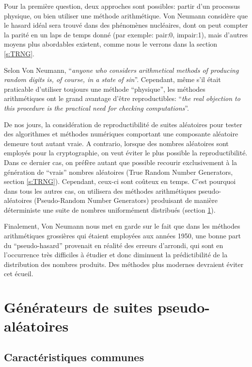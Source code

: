 \documentclass{scrartcl}
\begin{document}
Pour la première question, deux approches sont possibles: partir d'un processus
physique, ou bien utiliser une méthode arithmétique. Von Neumann considère que
le hasard idéal sera trouvé dans des phénomènes nucléaires, dont on peut compter
la parité en un laps de temps donné (par exemple: pair:0, impair:1), mais
d'autres moyens plus abordables existent, comme nous le verrons dans la section
\ref{s:TRNG}.

Selon Von Neumann, ``\textit{anyone who considers arithmetical methods of
  producing random digits is, of course, in a state of sin}''.  Cependant, même
s'il était praticable d'utiliser toujours une méthode ``physique'', les méthodes
arithmétiques ont le grand avantage d'être reproductibles: ``\textit{the real
  objection to this procedure is the practical need for checking
  computations}''.
\par\medskip

De nos jours, la considération de reproductibilité de suites aléatoires pour
tester des algorithmes et méthodes numériques comportant une composante
aléatoire demeure tout autant vraie. A contrario, lorsque des nombres aléatoires
sont employés pour la cryptographie, on veut éviter le plus possible la
reproductibilité. Dans ce dernier cas, on préfère autant que possible recourir
exclusivement à la génération de ``vrais'' nombres aléatoires (True Random
Number Generators, section \ref{s:TRNG}). Cependant, ceux-ci sont coûteux en
temps. C'est pourquoi dans tous les autres cas, on utilisera des méthodes
arithmétiques pseudo-aléatoires (Pseudo-Random Number Generators) produisant de
manière déterministe une suite de nombres uniformément distribués (section
\ref{s:PRNG}).
\par\medskip

Finalement, Von Neumann nous met en garde sur le fait que dans les méthodes
arithmétiques grossières qui étaient employées aux années 1950, une bonne part
du ``pseudo-hasard'' provenait en réalité des erreurs d'arrondi, qui sont en
l'occurrence très difficiles à étudier et donc diminuent la prédictibilité de la
distribution des nombres produits. Des méthodes plus modernes devraient éviter
cet écueil.


\section{Générateurs de suites pseudo-aléatoires}\label{s:PRNG}

\subsection{Caractéristiques communes}
\end{document}
